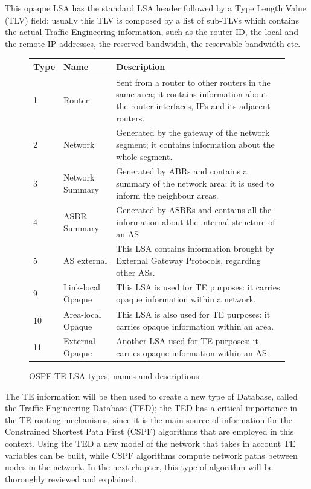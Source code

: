 \documentclass[10pt,a4paper]{report}
\begin{document}
\newpage

This opaque LSA has the standard LSA header followed by a Type Length
Value (TLV) field: usually this TLV is composed by a list of sub-TLVs
which contains the actual Traffic Engineering information, such as the
router ID, the local and the remote IP addresses, the reserved
bandwidth, the reservable bandwidth etc.

\begin{figure}[!tbp]
  \begin{center}
    \begin{tabular}{|l|l|p{}|}
      \hline
      Type& Name & Description \\ \hline
      1 &  Router & Sent from a router to other routers in the same
      area; it contains information about the router interfaces, IPs
      and its adjacent routers. \\
      2 & Network & Generated by the gateway of the network segment;
      it contains information about the whole segment. \\
      3 & Network Summary & Generated by ABRs and contains a summary
      of the network area; it is used to inform the neighbour areas. \\
      4 & ASBR Summary &  Generated by ASBRs and contains all the
      information about the internal structure of an AS \\
      5 & AS external &  This LSA contains information brought by
      External Gateway Protocols, regarding other ASs. \\
      9 & Link-local Opaque & This LSA is used for TE purposes: it
      carries opaque information within a network. \\
      10 & Area-local Opaque & This LSA is also used for TE purposes:
      it carries opaque information within an area. \\
      11 & External Opaque & Another LSA used for TE purposes: it
      carries opaque information within an AS. \\
      \hline
    \end{tabular}
    \caption[OSPF-TE LSA Types]{OSPF-TE LSA types, names and descriptions}
    \label{fig:ospf_lsa}
  \end{center}
\end{figure}

The TE information will be then used to create a new type of Database,
called the Traffic Engineering Database (TED); the TED has a critical
importance in the TE routing mechanisms, since it is the main source
of information for the Constrained Shortest Path First (CSPF)
algorithms that are employed in this context. Using the TED a new
model of the network that takes in account TE variables can be built,
while CSPF algorithms compute network paths between nodes in the
network. In the next chapter, this type of algorithm will be
thoroughly reviewed and explained.
\end{document}
